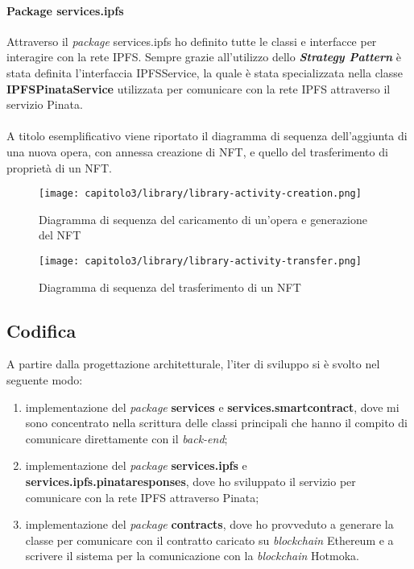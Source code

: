 \paragraph{Package services.ipfs} Attraverso il \textit{package} services.ipfs ho definito tutte le classi e interfacce per interagire con la rete IPFS. Sempre grazie all'utilizzo dello \textit{\textbf{Strategy Pattern}} è stata definita l'interfaccia IPFSService, la quale è stata specializzata nella classe \textbf{IPFSPinataService} utilizzata per comunicare con la rete IPFS attraverso il servizio Pinata.

\paragraph{}

A titolo esemplificativo viene riportato il diagramma di sequenza dell'aggiunta di una nuova opera, con annessa creazione di NFT, e quello del trasferimento di proprietà di un NFT.

\begin{figure}[h!]
  \centering
  \texttt{[image: capitolo3/library/library-activity-creation.png]}
  \caption{Diagramma di sequenza del caricamento di un'opera e generazione del NFT}
\end{figure}

\begin{figure}[h!]
  \centering
  \texttt{[image: capitolo3/library/library-activity-transfer.png]}
  \caption{Diagramma di sequenza del trasferimento di un NFT}
\end{figure}

\subsection{Codifica}
A partire dalla progettazione architetturale, l'iter di sviluppo si è svolto nel seguente modo:
\begin{enumerate}
  \item implementazione del \textit{package} \textbf{services} e \textbf{services.smartcontract}, dove mi sono concentrato nella scrittura delle classi principali che hanno il compito di comunicare direttamente con il \textit{back-end};
  \item implementazione del \textit{package} \textbf{services.ipfs} e \textbf{services.ipfs.pinataresponses}, dove ho sviluppato il servizio per comunicare con la rete IPFS attraverso Pinata;
  \item implementazione del \textit{package} \textbf{contracts}, dove ho provveduto a generare la classe per comunicare con il contratto caricato su \textit{blockchain} Ethereum e a scrivere il sistema per la comunicazione con la \textit{blockchain} Hotmoka.
\end{enumerate}

